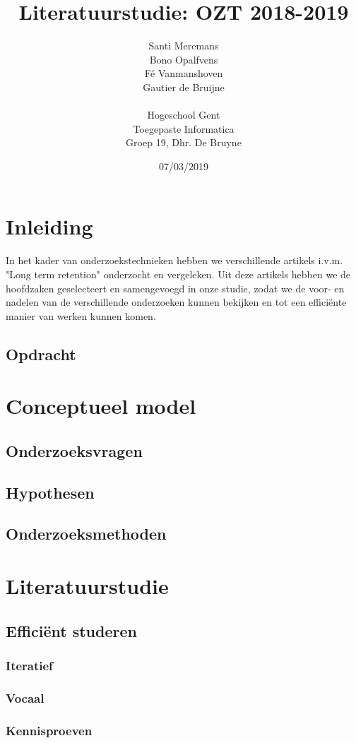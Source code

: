 \documentclass{article}
\title{Literatuurstudie: OZT 2018-2019}
\date{07/03/2019}
\author{Santi Meremans \\ Bono Opalfvens \\ Fé Vanmanshoven \\ Gautier de Bruijne \\\\ Hogeschool Gent \\ Toegepaste Informatica \\ Groep 19, Dhr. De Bruyne}
\begin{document}
\maketitle
{}
\newpage

\renewcommand*\contentsname{Inhoudstafel}

\tableofcontents
\newpage

\section{Inleiding}
In het kader van onderzoekstechnieken hebben we verschillende artikels i.v.m. "Long term retention" onderzocht en vergeleken. Uit deze artikels hebben we de hoofdzaken geselecteert en samengevoegd in onze studie, zodat we de voor- en nadelen van de verschillende onderzoeken kunnen bekijken en tot een efficiënte manier van werken kunnen komen.

\subsection{Opdracht}

\section{Conceptueel model}
\subsection{Onderzoeksvragen}
\subsection{Hypothesen}
\subsection{Onderzoeksmethoden}

\section{Literatuurstudie}
\subsection{Efficiënt studeren}
\subsubsection{Iteratief}
\subsubsection{Vocaal}
\subsubsection{Kennisproeven}
\end{document}
